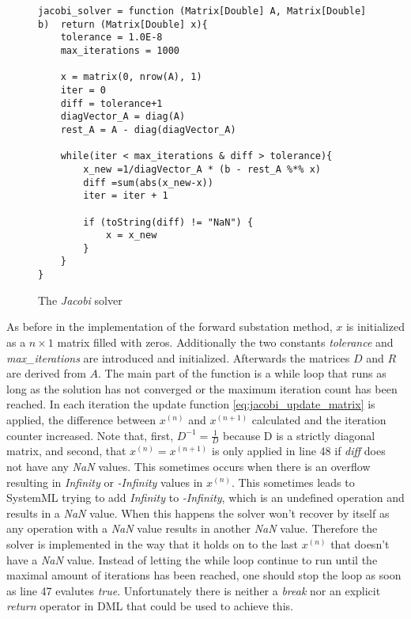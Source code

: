 \begin{figure}[!ht]
\centering
\begin{verbatim}
jacobi_solver = function (Matrix[Double] A, Matrix[Double] b)  return (Matrix[Double] x){
    tolerance = 1.0E-8
    max_iterations = 1000
    
    x = matrix(0, nrow(A), 1)
    iter = 0
    diff = tolerance+1
    diagVector_A = diag(A)
    rest_A = A - diag(diagVector_A)
    
    while(iter < max_iterations & diff > tolerance){
        x_new =1/diagVector_A * (b - rest_A %*% x)
        diff =sum(abs(x_new-x))
        iter = iter + 1
        
        if (toString(diff) != "NaN") {
            x = x_new
        }
    }
}
\end{verbatim}
\vspace*{-0.3cm}
\caption{The \textit{Jacobi} solver}
\label{fig:jacobi}
\end{figure}

As before in the implementation of the forward substation method, $x$ is initialized as a $n \times 1$ matrix filled with zeros. Additionally the two constants \textit{tolerance} and \textit{max\_iterations} are introduced and initialized. Afterwards the matrices $D$ and $R$ are derived from $A$. The main part of the function is a while loop that runs as long as the solution has not converged or the maximum iteration count has been reached. In each iteration the update function \eqref{eq:jacobi_update_matrix} is applied, the difference between $x^{(n)}$ and $x^{(n+1)}$ calculated and the iteration counter increased. Note that, first,  $D^{-1}=\frac{1}{D}$ because D is a strictly diagonal matrix, and second, that $x^{(n)}=x^{(n+1)}$ is only applied in line 48 if \textit{diff} does not have any \textit{NaN} values. This sometimes occurs when there is an overflow resulting in \textit{Infinity} or \textit{-Infinity} values in $x^{(n)}$. This sometimes leads to SystemML trying to add \textit{Infinity} to \textit{-Infinity}, which is an undefined operation and results in a \textit{NaN} value. When this happens the solver won't recover by itself as any operation with a \textit{NaN} value results in another \textit{NaN} value. Therefore the solver is implemented in the way that it holds on to the last $x^{(n)}$ that doesn't have a \textit{NaN} value. Instead of letting the while loop continue to run until the maximal amount of iterations has been reached, one should stop the loop as soon as line 47 evalutes \textit{true}. Unfortunately there is neither a \textit{break} nor an explicit \textit{return} operator in \acs{DML} that could be used to achieve this.

